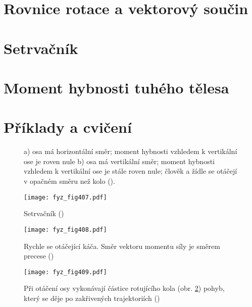   \section{Rovnice rotace a vektorový součin}\label{fyz:IchapXXsecII}
  \section{Setrvačník}\label{fyz:IchapXXsecIII}
  \section{Moment hybnosti tuhého tělesa}\label{fyz:IchapXXsecIV}
  \section{Příklady a cvičení}\label{fyz:IchapXXsecV}  

  \begin{figure}[ht!] %
    \centering
    \caption{a) osa má horizontální směr; moment hybnosti vzhledem k vertikální ose je roven nule 
             b) osa má vertikální směr; moment hybnosti vzhledem k vertikální ose je stále roven 
             nule; člověk a žídle se otáčejí v opačném směru než kolo
             (\cite[s.~278]{Feynman01}).}
    \label{fyz:fig406}
  \end{figure}

  \begin{figure}[ht!] %
    \centering
    \texttt{[image: fyz\_fig407.pdf]}
    \caption{Setrvačník
             (\cite[s.~279]{Feynman01})}
    \label{fyz:fig407}
  \end{figure}

  \begin{figure}[ht!] %
    \centering
    \texttt{[image: fyz\_fig408.pdf]}
    \caption{Rychle se otáčející káča. Směr vektoru momentu síly je směrem precese 
             (\cite[s.~280]{Feynman01})}
    \label{fyz:fig408}
  \end{figure}

  \begin{figure}[ht!] %
    \centering
    \texttt{[image: fyz\_fig409.pdf]}
    \caption{Při otáčení osy vykonávají částice rotujícího kola (obr. \ref{fyz:fig407}) pohyb, 
             který se děje po zakřivených trajektoriích 
             (\cite[s.~280]{Feynman01})}
    \label{fyz:fig409}
  \end{figure}

